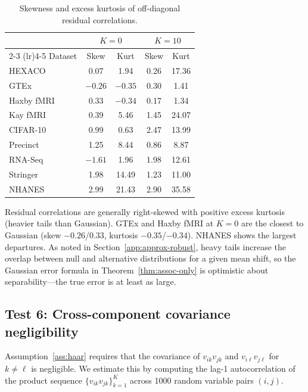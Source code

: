 \begin{table}[h]
\centering
\caption{Skewness and excess kurtosis of off-diagonal residual correlations.}
\label{tab:normality}
\begin{tabular}{lcccc}
\toprule
& \multicolumn{2}{c}{$K{=}0$} & \multicolumn{2}{c}{$K{=}10$} \\
\cmidrule(lr){2-3} \cmidrule(lr){4-5}
Dataset & Skew & Kurt & Skew & Kurt \\
\midrule
HEXACO      & 0.07  & 1.94  & 0.26  & 17.36 \\
GTEx        & $-0.26$ & $-0.35$ & 0.30  & 1.41 \\
Haxby fMRI  & 0.33  & $-0.34$ & 0.17  & 1.34 \\
Kay fMRI    & 0.39  & 5.46  & 1.45  & 24.07 \\
CIFAR-10    & 0.99  & 0.63  & 2.47  & 13.99 \\
Precinct    & 1.25  & 8.44  & 0.86  & 8.87 \\
RNA-Seq     & $-1.61$ & 1.96 & 1.98  & 12.61 \\
Stringer    & 1.98  & 14.49 & 1.23  & 11.00 \\
NHANES      & 2.99  & 21.43 & 2.90  & 35.58 \\
\bottomrule
\end{tabular}
\end{table}

Residual correlations are generally right-skewed with positive excess kurtosis
(heavier tails than Gaussian). GTEx and Haxby fMRI at $K{=}0$ are the closest to Gaussian
(skew $-0.26$/$0.33$, kurtosis $-0.35$/$-0.34$). NHANES shows the largest departures.
As noted in Section~\ref{app:approx-robust}, heavy tails increase the overlap
between null and alternative distributions for a given mean shift,
so the Gaussian error formula in Theorem~\ref{thm:assoc-only} is optimistic
about separability---the true error is at least as large.

\subsection{Test 6: Cross-component covariance negligibility}

Assumption~\ref{ass:haar} requires that the covariance of $v_{ik}v_{jk}$ and
$v_{i\ell}v_{j\ell}$ for $k \neq \ell$ is negligible.
We estimate this by computing the lag-1 autocorrelation of the product sequence
$\{v_{ik}v_{jk}\}_{k=1}^K$ across 1000 random variable pairs $(i,j)$.

